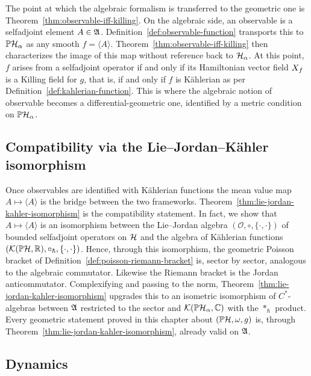 The point at which the algebraic formalism is transferred to the geometric one is Theorem~\ref{thm:observable-iff-killing}. On the algebraic side, an observable is a selfadjoint element $A\in\mathfrak{A}$. Definition~\ref{def:observable-function} transports this to $\PH_\alpha$ as any smooth $f=\langle A\rangle$. Theorem~\ref{thm:observable-iff-killing} then characterizes the image of this map without reference back to $\H_\alpha$. At this point, $f$ arises from a selfadjoint operator if and only if its Hamiltonian vector field $X_{f}$ is a Killing field for $g$, that is, if and only if $f$ is Kählerian as per Definition~\ref{def:kahlerian-function}. This is where the algebraic notion of observable becomes a  differential-geometric one, identified by a metric condition on $\PH_\alpha$.


\subsection*{Compatibility via the Lie--Jordan--Kähler isomorphism}

Once observables are identified with Kählerian functions the mean value map $A\mapsto\langle A\rangle$ is the bridge between the two frameworks. Theorem~\ref{thm:lie-jordan-kahler-isomorphism} is the compatibility statement. In fact, we show that $A\mapsto\langle A\rangle$ is an isomorphism between the Lie--Jordan algebra $(\mathcal O,\circ,\{\cdot,\cdot\})$ of bounded selfadjoint operators on $\H$ and the algebra of Kählerian functions $(\mathcal K(\PH,\R),\circ_{\hbar},\poisson{\cdot}{\cdot})$. Hence, through this isomorphism, the geometric Poisson bracket of Definition~\ref{def:poisson-riemann-bracket} is, sector by sector, analogous to the algebraic commutator. Likewise the Riemann bracket is the Jordan anticommutator. Complexifying and passing to the norm, Theorem~\ref{thm:lie-jordan-kahler-isomorphism} upgrades this to an isometric isomorphism of $C^*$-algebras between $\mathfrak{A}$ restricted to the sector and $\mathcal K(\PH_\alpha,\C)$ with the $*_{\hbar}$ product. Every geometric statement proved in this chapter about $(\PH,\omega,g)$ is, through Theorem~\ref{thm:lie-jordan-kahler-isomorphism}, already valid on $\mathfrak{A}$.

\subsection*{Dynamics}

